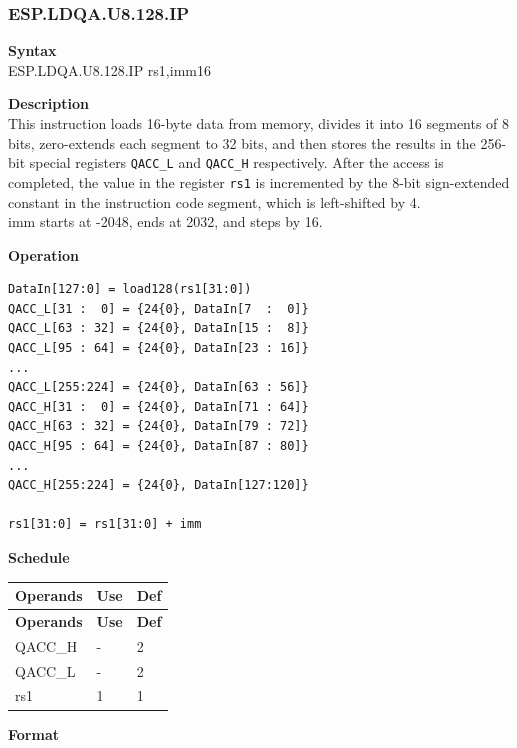 \newpage
\subsubsection{ESP.LDQA.U8.128.IP}\label{instruction:ESPLDQAU8128IP}
\textbf{Syntax}\\
ESP.LDQA.U8.128.IP rs1,imm16

\textbf{Description}\\
This instruction loads 16-byte data from memory, divides it into 16 segments of 8 bits, zero-extends each segment to 32 bits, and then stores the results in the 256-bit special registers \lstinline{QACC_L} and \lstinline{QACC_H} respectively. After the access is completed, the value in the register \lstinline{rs1} is incremented by the 8-bit sign-extended constant in the instruction code segment, which is left-shifted by 4.\\

imm starts at -2048, ends at 2032, and steps by 16.

\textbf{Operation}
\begin{lstlisting}
DataIn[127:0] = load128(rs1[31:0])
QACC_L[31 :  0] = {24{0}, DataIn[7  :  0]}
QACC_L[63 : 32] = {24{0}, DataIn[15 :  8]}
QACC_L[95 : 64] = {24{0}, DataIn[23 : 16]}
...
QACC_L[255:224] = {24{0}, DataIn[63 : 56]}
QACC_H[31 :  0] = {24{0}, DataIn[71 : 64]}
QACC_H[63 : 32] = {24{0}, DataIn[79 : 72]}
QACC_H[95 : 64] = {24{0}, DataIn[87 : 80]}
...
QACC_H[255:224] = {24{0}, DataIn[127:120]}

rs1[31:0] = rs1[31:0] + imm
\end{lstlisting}

\textbf{Schedule}\\
\begin{longtable}[c]{|l|l|l|}
    \hline
    \rowcolor{lightgray}
    \textbf{Operands} & \textbf{Use} & \textbf{Def} \\\hline
    \endfirsthead
    \hline
    \rowcolor{lightgray}
     \textbf{Operands} & \textbf{Use} & \textbf{Def} \\\hline
    \endhead
    \hline
    \endfoot

  QACC\_H & - & 2 \\\hline
    QACC\_L & - & 2 \\\hline
  rs1 & 1 & 1

\end{longtable}

\textbf{Format}\\

